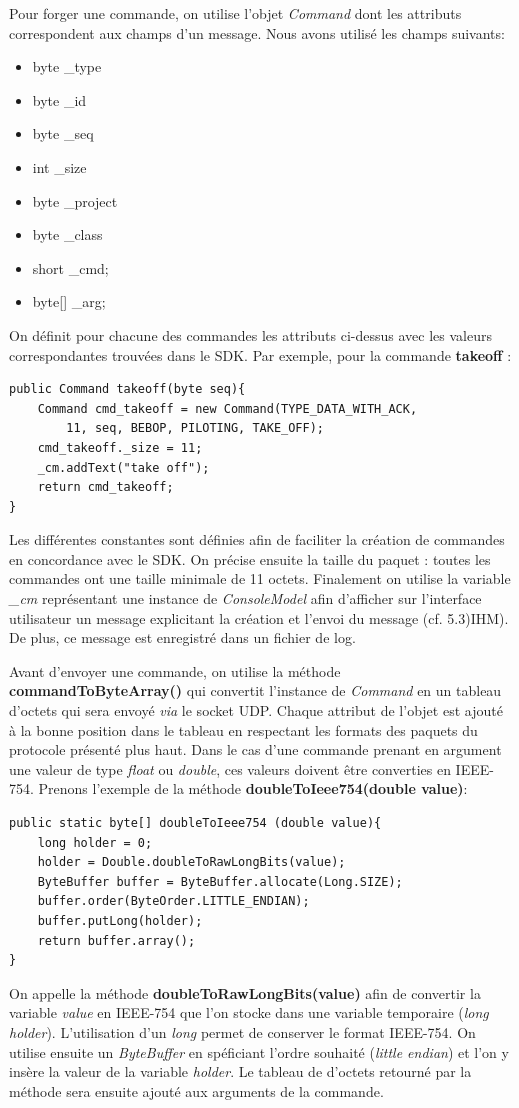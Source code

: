 \documentclass[12pt, openany]{report}
\begin{document}
Pour forger une commande, on utilise l'objet \textit{Command} dont les attributs correspondent aux champs d'un message. Nous avons utilisé les champs suivants:
\begin{itemize}
\item byte \_type
\item byte \_id
\item byte \_seq
\item int \_size
\item byte \_project
\item byte \_class
\item short \_cmd;
\item byte[] \_arg;
\end{itemize}
On définit pour chacune des commandes les attributs ci-dessus avec les valeurs correspondantes trouvées dans le SDK. Par exemple, pour la commande \textbf{takeoff} :
\newpage
\begin{lstlisting}[frame=single]
public Command takeoff(byte seq){
	Command cmd_takeoff = new Command(TYPE_DATA_WITH_ACK,
		11, seq, BEBOP, PILOTING, TAKE_OFF);
	cmd_takeoff._size = 11;
	_cm.addText("take off");
	return cmd_takeoff;
}
\end{lstlisting}
Les différentes constantes sont définies afin de faciliter la création de commandes en concordance avec le SDK. On précise ensuite la taille du paquet : toutes les commandes ont une taille minimale de 11 octets. Finalement on utilise la variable \textit{\_cm} représentant une instance de \textit{ConsoleModel} afin d'afficher sur l'interface utilisateur un message explicitant la création et l'envoi du message (cf. 5.3)IHM). De plus, ce message est enregistré dans un fichier de log.

Avant d'envoyer une commande, on utilise la méthode \textbf{commandToByteArray()} qui convertit l'instance de \textit{Command} en un tableau d'octets qui sera envoyé \textit{via} le socket UDP. Chaque attribut de l'objet est ajouté à la bonne position dans le tableau en respectant les formats des paquets du protocole présenté plus haut. Dans le cas d'une commande prenant en argument une valeur de type \textit{float} ou \textit{double}, ces valeurs doivent être converties en IEEE-754. Prenons l'exemple de la méthode \textbf{doubleToIeee754(double value)}:
\begin{lstlisting}[frame=single]
public static byte[] doubleToIeee754 (double value){
	long holder = 0;
	holder = Double.doubleToRawLongBits(value);
	ByteBuffer buffer = ByteBuffer.allocate(Long.SIZE);
	buffer.order(ByteOrder.LITTLE_ENDIAN);
	buffer.putLong(holder);
	return buffer.array();
}
\end{lstlisting}
On appelle la méthode \textbf{doubleToRawLongBits(value)} afin de convertir la variable \textit{value} en IEEE-754 que l'on stocke dans une variable temporaire (\textit{long holder}). L'utilisation d'un \textit{long} permet de conserver le format IEEE-754. On utilise ensuite un \textit{ByteBuffer} en spéficiant l'ordre souhaité (\textit{little endian}) et l'on y insère la valeur de la variable \textit{holder}. Le tableau de d'octets retourné par la méthode sera ensuite ajouté aux arguments de la commande.
\end{document}
